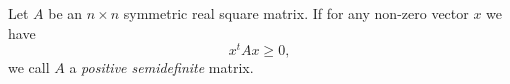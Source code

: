 \documentclass[12pt]{article}
\begin{document}
Let $A$ be an $n\times n$ symmetric real square matrix. If for any non-zero vector $x$ we have
$$x^t Ax\geq 0,$$
we call $A$ a \emph{positive semidefinite} matrix.
\end{document}

